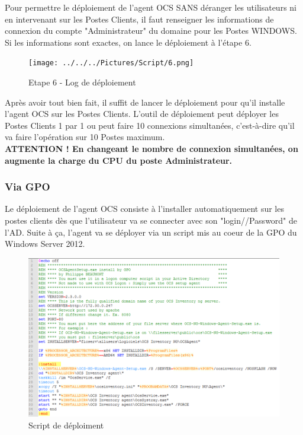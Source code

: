 \documentclass[11pt,a4paper,oneside]{article}
\begin{document}
Pour permettre le déploiement de l'agent OCS SANS déranger les utilisateurs ni en intervenant sur les Postes Clients, il faut renseigner les informations de connexion du compte "Administrateur" du domaine pour les Postes WINDOWS. Si les informations sont exactes, on lance le déploiement à l'étape 6.

\begin{figure}[hbtp]
\centering
\texttt{[image: ../../../Pictures/Script/6.png]}
\caption{Etape 6 - Log de déploiement}
\end{figure}

Après avoir tout bien fait, il suffit de lancer le déploiement pour qu'il installe l'agent OCS sur les Postes Clients. L'outil de déploiement peut déployer les Postes Clients 1 par 1 ou peut faire 10 connexions simultanées, c'est-à-dire qu'il va faire l'opération sur 10 Postes maximum. \\ 
\textbf{ATTENTION ! En changeant le nombre de connexion simultanées, on augmente la charge du CPU du poste Administrateur.}
\newpage
\subsubsection{Via GPO}
Le déploiement de l'agent OCS consiste à l'installer automatiquement sur les postes clients dès que l'utilisateur va se connecter avec son "login//Password" de l'AD. Suite à ça, l'agent va se déployer via un script mis au coeur de la GPO du Windows Server 2012.
\\
\begin{figure}[hbtp]
\centering
\includegraphics[scale=0.7]{Script/DeploiementGPO1.PNG}
\caption{Script de déploiment}
\end{figure}
\end{document}
